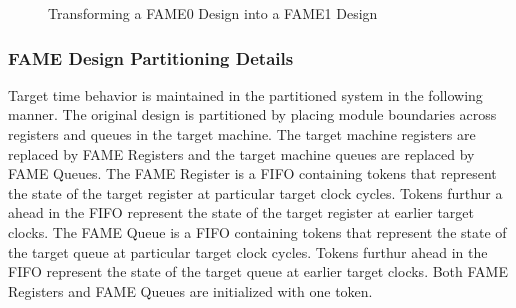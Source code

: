 \begin{figure}
	\centering
    \caption{Transforming a FAME0 Design into a FAME1 Design}
	\label{fig:fame-partition}
\end{figure}

\subsubsection{FAME Design Partitioning Details}
Target time behavior is maintained in the partitioned system in the following manner. The original design is partitioned by placing module boundaries across registers and queues in the target machine. The target machine registers are replaced by FAME Registers and the target machine queues are replaced by FAME Queues. The FAME Register is a FIFO containing tokens that represent the state of the target register at particular target clock cycles. Tokens furthur a ahead in the FIFO represent the state of the target register at earlier target clocks. The FAME Queue is a FIFO containing tokens that represent the state of the target queue at particular target clock cycles. Tokens furthur ahead in the FIFO represent the state of the target queue at earlier target clocks. Both FAME Registers and FAME Queues are initialized with one token. 

